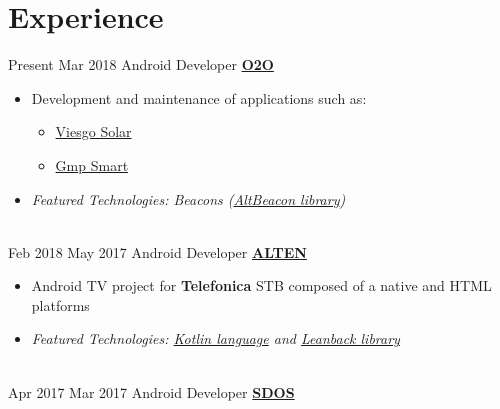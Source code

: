 \documentclass[letterpaper]{twentysecondcv} %
\begin{document}
\makeprofile %


\section{Experience}

\begin{twenty} %
\twentyitem
    	{Present}
		{Mar 2018}
        {Android Developer}
        {\href{www.mo2o.com}{\textbf{O2O}}}
        {}
        {\begin{itemize}
        \item Development and maintenance of applications such as:
        	{\begin{itemize}
        	\item\href{https://play.google.com/store/apps/details?id=com.viesgo.solar&hl=es}{Viesgo Solar}
         	\end{itemize}}
         	{\begin{itemize}
        	\item\href{https://play.google.com/store/apps/details?id=com.mo2o.gmp}{Gmp Smart}
         	\end{itemize}}
        \item \textit{Featured Technologies: Beacons (\href{https://github.com/AltBeacon/android-beacon-library}{AltBeacon library})}
        \end{itemize}}
        \\
\twentyitem
    	{Feb 2018}
		{May 2017}
        {Android Developer}
        {\href{http://www.alten.es/}{\textbf{ALTEN}}}
        {}
        {\begin{itemize}
        \item Android TV project for \textbf{Telefonica} STB composed of a native and HTML platforms
        \item \textit{Featured Technologies: \href{https://developer.android.com/kotlin/index.html}{Kotlin language} and \href{https://developer.android.com/tv/index.html}{Leanback library}}
        \end{itemize}}
        \\
	\twentyitem
    	{Apr 2017}
		{Mar 2017}
        {Android Developer}
        {\href{http://sdos.es/}{\textbf{SDOS}}}
        {}
        {
        {\begin{itemize}

\end{itemize}}}
\end{twenty}
\end{document}
